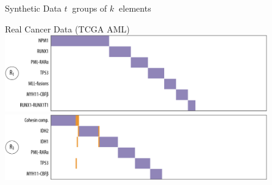 \documentclass[mathserif]{beamer}
\begin{document}
\begin{frame}{Synthetic Data}
$t\ $ groups of $k\ $ elements\\
\vspace{1em}
\centering
{}%
%
\end{frame}

\begin{frame}{Real Cancer Data (TCGA AML)}
\vspace{1em}
\centering
\includegraphics[width=0.85\textwidth]{figures/aml_1.pdf}\\[2em]
\includegraphics[width=0.85\textwidth]{figures/aml_3.pdf}
\end{frame}
\end{document}

